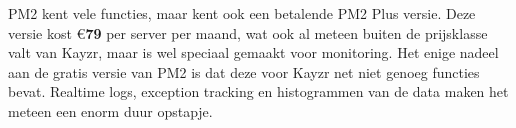 PM2 kent vele functies, maar kent ook een betalende PM2 Plus versie. Deze versie kost \euro\textbf{79} per server per maand, wat ook al meteen buiten de prijsklasse valt van Kayzr, maar is wel speciaal gemaakt voor monitoring. Het enige nadeel aan de gratis versie van PM2 is dat deze voor Kayzr net niet genoeg functies bevat. Realtime logs, exception tracking en histogrammen van de data maken het meteen een enorm duur opstapje.



 






 
